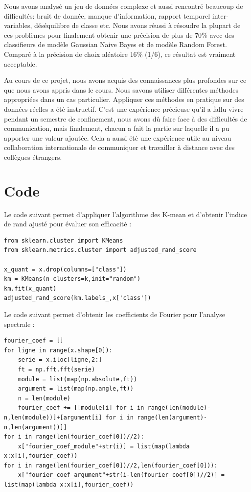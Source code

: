 \documentclass[twocolumn,10pt]{article}
\begin{document}
Nous avons analysé un jeu de données complexe et aussi rencontré beaucoup de difficultés: bruit de donnée, manque d'information, rapport temporel inter-variables, déséquilibre de classe etc. Nous avons réussi à résoudre la plupart de ces problèmes pour finalement obtenir une précision de plus de $ 70\% $ avec des classifieurs de modèle Gaussian Naive Bayes et de modèle Random Forest. Comparé à la précision de choix aléatoire $ 16\% $ (1/6), ce résultat est vraiment acceptable.

Au cours de ce projet, nous avons acquis des connaissances plus profondes sur ce que nous avons appris dans le cours. Nous savons utiliser différentes méthodes appropriées dans un cas particulier. Appliquer ces méthodes en pratique sur des données réelles a été instructif. C'est une expérience précieuse qu'il a fallu vivre pendant un semestre de confinement, nous avons dû faire face à des difficultés de communication, mais finalement, chacun a fait la partie sur laquelle il a pu apporter une valeur ajoutée. Cela a aussi été une expérience utile au niveau collaboration internationale de communiquer et travailler à distance avec des collègues étrangers. 






\appendix %

\section{Code}\label{ann:code}

Le code suivant permet d'appliquer l'algorithme des K-mean et d'obtenir l'indice de rand ajusté pour évaluer son efficacité : 

\begin{verbatim}
from sklearn.cluster import KMeans
from sklearn.metrics.cluster import adjusted_rand_score

x_quant = x.drop(columns=["class"])
km = KMeans(n_clusters=k,init="random")
km.fit(x_quant)
adjusted_rand_score(km.labels_,x['class'])
\end{verbatim}

Le code suivant permet d'obtenir les coefficients de Fourier pour l'analyse spectrale : 

\begin{verbatim}
fourier_coef = []
for ligne in range(x.shape[0]):
    serie = x.iloc[ligne,2:]
    ft = np.fft.fft(serie)
    module = list(map(np.absolute,ft))
    argument = list(map(np.angle,ft))
    n = len(module)
    fourier_coef += [[module[i] for i in range(len(module)-n,len(module))]+[argument[i] for i in range(len(argument)-n,len(argument))]]
for i in range(len(fourier_coef[0])//2):
    x["fourier_coef_module"+str(i)] = list(map(lambda x:x[i],fourier_coef))
for i in range(len(fourier_coef[0])//2,len(fourier_coef[0])):
    x["fourier_coef_argument"+str(i-len(fourier_coef[0])//2)] = list(map(lambda x:x[i],fourier_coef))
\end{verbatim}
\end{document}
